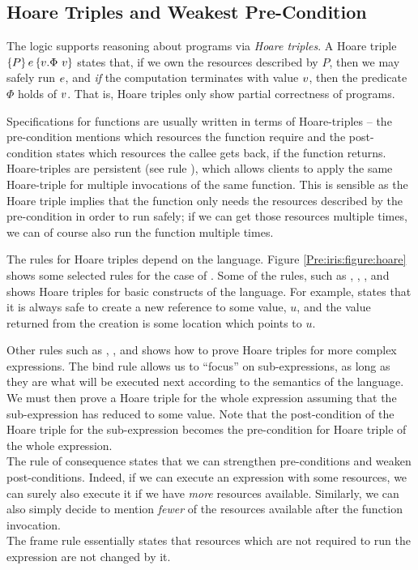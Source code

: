 \documentclass[a4paper, 10pt]{report}
\theoremstyle{definition}
\begin{document}
\subsection{Hoare Triples and Weakest Pre-Condition}
The logic supports reasoning about programs via \textit{Hoare triples}. A Hoare triple $\hoare{P}{\expr}{\val . \Phi ~ \val}$ states that, if we own the resources described by $P$, then we may safely run $e$, and \emph{if} the computation terminates with value $v$, then the predicate $\Phi$ holds of $v$. That is, Hoare triples only show partial correctness of programs.

Specifications for functions are usually written in terms of Hoare-triples -- the pre-condition mentions which resources the function require and the post-condition states which resources the callee gets back, if the function returns. Hoare-triples are persistent (see rule ), which allows clients to apply the same Hoare-triple for multiple invocations of the same function. This is sensible as the Hoare triple implies that the function only needs the resources described by the pre-condition in order to run safely; if we can get those resources multiple times, we can of course also run the function multiple times.

The rules for Hoare triples depend on the language. Figure \ref{Pre:iris:figure:hoare} shows some selected rules for the case of \heaplang{}. Some of the rules, such as , , , and  shows Hoare triples for basic constructs of the language. For example,  states that it is always safe to create a new reference to some value, $u$, and the value returned from the creation is some location which points to $u$.

Other rules such as , , and  shows how to prove Hoare triples for more complex expressions. The bind rule allows us to ``focus'' on sub-expressions, as long as they are what will be executed next according to the semantics of the language. We must then prove a Hoare triple for the whole expression assuming that the sub-expression has reduced to some value. Note that the post-condition of the Hoare triple for the sub-expression becomes the pre-condition for Hoare triple of the whole expression.\\
The rule of consequence states that we can strengthen pre-conditions and weaken post-conditions. Indeed, if we can execute an expression with some resources, we can surely also execute it if we have \emph{more} resources available. Similarly, we can also simply decide to mention \emph{fewer} of the resources available after the function invocation.\\
The frame rule essentially states that resources which are not required to run the expression are not changed by it.
\end{document}
